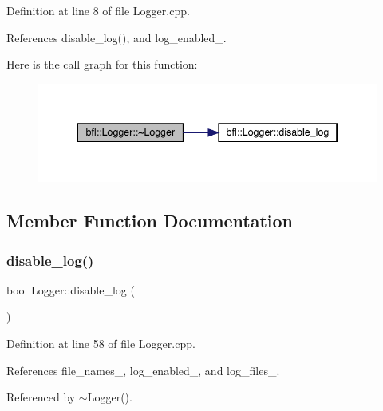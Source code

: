 Definition at line 8 of file Logger.\+cpp.



References disable\+\_\+log(), and log\+\_\+enabled\+\_\+.

Here is the call graph for this function\+:
\nopagebreak
\begin{figure}[H]
\begin{center}
\leavevmode
\includegraphics[width=341pt]{classbfl_1_1Logger_a843a878e056f9c2c835d9bddffb6692a_cgraph}
\end{center}
\end{figure}


\subsection{Member Function Documentation}
\mbox{\label{classbfl_1_1Logger_a440467a28ccc46490d767fe0ef6f556a}} 
\subsubsection{\texorpdfstring{disable\+\_\+log()}{disable\_log()}}
{\footnotesize\ttfamily bool Logger\+::disable\+\_\+log (\begin{DoxyParamCaption}{ }\end{DoxyParamCaption})}



Definition at line 58 of file Logger.\+cpp.



References file\+\_\+names\+\_\+, log\+\_\+enabled\+\_\+, and log\+\_\+files\+\_\+.



Referenced by $\sim$\+Logger().

\mbox{\label{classbfl_1_1Logger_ae94b97b6e8d7902e8ce048384813122e}} 
